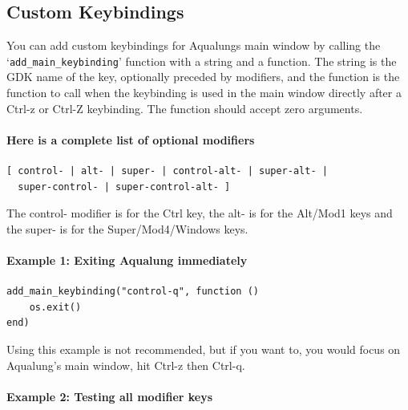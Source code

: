 \documentclass[10pt,english]{article}
\begin{document}
\subsection{Custom Keybindings\label{idp2027104}}



\noindent You can add custom keybindings for Aqualungs main window by
calling the `\texttt{add\_main\_keybinding}'
function with a string and a function.  The string is the
GDK name of the key, optionally preceded by modifiers, and the
function is the function to call when the keybinding is used in
the main window directly after a Ctrl-z or Ctrl-Z keybinding.
The function should accept zero arguments.


\paragraph*{Here is a complete list of optional modifiers}

\begin{verbatim}
[ control- | alt- | super- | control-alt- | super-alt- |
  super-control- | super-control-alt- ]
\end{verbatim}



\noindent The control- modifier is for the Ctrl key, the alt- is for
the Alt/Mod1 keys and the super- is for the Super/Mod4/Windows keys.



\paragraph*{Example 1: Exiting Aqualung immediately}

\begin{verbatim}
add_main_keybinding("control-q", function ()
    os.exit()
end)
\end{verbatim}



\noindent Using this example is not recommended, but if you want to,
you would focus on Aqualung's main window, hit Ctrl-z then
Ctrl-q.




\paragraph*{Example 2: Testing all modifier keys}
\end{document}
